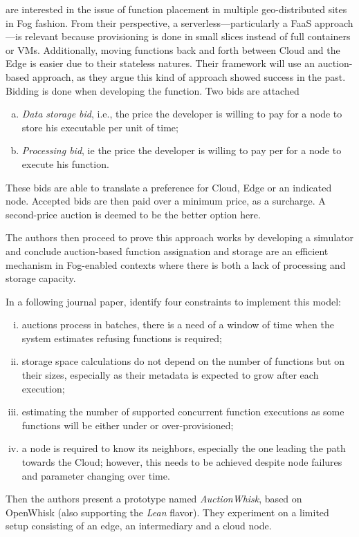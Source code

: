 \begin{description}[leftmargin=10pt]
	\item[\citet{bermbach_towards_2021}] are interested in the issue of function placement in multiple geo-distributed sites in Fog fashion. From their perspective, a serverless—particularly a \gls{FaaS} approach—is relevant because provisioning is done in small slices instead of full containers or \glspl{VM}. Additionally, moving functions back and forth between Cloud and the Edge is easier due to their stateless natures. Their framework will use an auction-based approach, as they argue this kind of approach showed success in the past.
		Bidding is done when developing the function. Two bids are attached
		\begin{enumerate}[(a)]
			\item \emph{Data storage bid}, i.e., the price the developer is willing to pay for a node to store his executable per unit of time;
			\item \emph{Processing bid}, ie the price the developer is willing to pay per for a node to execute his function.
		\end{enumerate}
		These bids are able to translate a preference for Cloud, Edge or an indicated node. Accepted bids are then paid over a minimum price, as a surcharge. A second-price auction is deemed to be the better option here.

		The authors then proceed to prove this approach works by developing a simulator and conclude auction-based function assignation and storage are an efficient mechanism in Fog-enabled contexts where there is both a lack of processing and storage capacity.

		In a following journal paper, \citet{bermbach_auctionwhisk_2021} identify four constraints to implement this model:
		\begin{enumerate}[(i)]
			\item auctions process in batches, there is a need of a window of time when the system estimates refusing functions is required;
			\item storage space calculations do not depend on the number of functions but on their sizes, especially as their metadata is expected to grow after each execution;
			\item estimating the number of supported concurrent function executions as some functions will be either under or over-provisioned;
			\item a node is required to know its neighbors, especially the one leading the path towards the Cloud; however, this needs to be achieved despite node failures and parameter changing over time.
		\end{enumerate}

		Then the authors present a prototype named \emph{AuctionWhisk}, based on OpenWhisk (also supporting the \emph{Lean} flavor). They experiment on a limited setup consisting of an edge, an intermediary and a cloud node.

\end{description}

